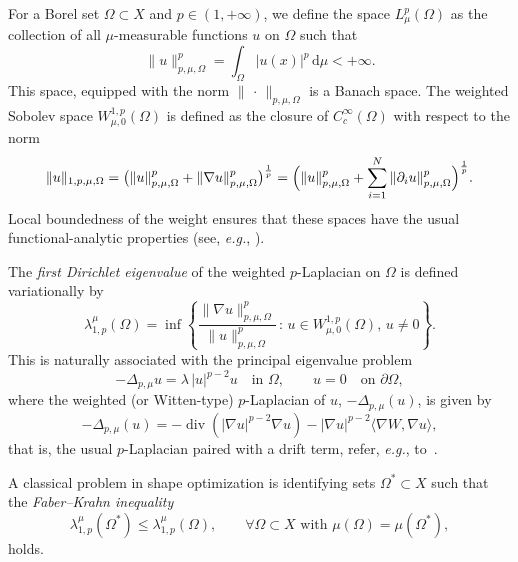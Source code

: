 \documentclass[a4paper,12pt,reqno]{amsart}
\numberwithin{equation}{section}
\DeclareMathOperator{\Div}{div}
\renewcommand{\div}{\Div}
\theoremstyle{plain}
\theoremstyle{definition}
\begin{document}
For a Borel set $\Omega\subset X$ and $p\in(1,+\infty)$, we define the space $L^p_\mu(\Omega)$ as the collection of all $\mu$-measurable functions $u$ on $\Omega$ such that
%
\[
\|u\|_{p,\mu,\Omega}^p = \int_\Omega |u(x)|^p \,\mathrm{d}\mu < +\infty.
\]
%
This space, equipped with the norm $\|\,\cdot\,\|_{p,\mu,\Omega}$ is a Banach space.
%
The weighted Sobolev space $W^{1,p}_{\mu,0}(\Omega)$ is defined as the closure of $C^\infty_c(\Omega)$ with respect to the norm
%
\begin{equation}
\label{eq:norm}
\|u\|_{1,p,\mu,\Omega}
= 
\bigl(\|u\|_{p,\mu,\Omega}^p + \|\nabla u\|_{p,\mu,\Omega}^p \bigr)^{\frac1p}
= 
\Bigl(\|u\|_{p,\mu,\Omega}^p + \sum_{i=1}^N \|\partial_i u\|^p_{p,\mu,\Omega} \Bigr)^{\frac1p}.
\end{equation}
%
Local boundedness of the weight ensures that these spaces have the usual functional-analytic properties (see, \emph{e.g.}, \cite{Bre10book,KO84}).

The \emph{first Dirichlet eigenvalue} of the weighted $p$-Laplacian on $\Omega$ is defined variationally by
%
\begin{equation*}
\lambda_{1,p}^\mu(\Omega)
=
\inf
\left\{
\frac{\|\nabla u\|^p_{p,\mu,\Omega}}{\|u\|^p_{p,\mu,\Omega}} \,:\, u\in W^{1,p}_{\mu,0}(\Omega),\, u \neq 0
\right\}.
\end{equation*}
%
This is naturally associated with the principal eigenvalue problem 
%
\[
-\Delta_{p,\mu} u = \lambda\,|u|^{p-2}u \quad\text{in }\Omega,\qquad u=0\quad\text{on }\partial\Omega,
\]
%
where the weighted (or Witten-type) $p$-Laplacian of $u$, $-\Delta_{p,\mu}(u)$, is given by
%
\[
-\Delta_{p,\mu}(u) = -\div(|\nabla u|^{p-2}\nabla u) - |\nabla u|^{p-2}\langle \nabla W, \nabla u\rangle,
\]
%
that is, the usual $p$-Laplacian paired with a drift term, refer, \emph{e.g.}, to~\cite{DMWX21}.

A classical problem in shape optimization is identifying sets $\Omega^*\subset X$ such that the \emph{Faber--Krahn inequality}
%
\begin{equation}
\label{eq:fk-ineq}
\lambda_{1,p}^\mu(\Omega^*) \le \lambda_{1,p}^\mu(\Omega), \qquad \forall \Omega\subset X \text{ with } \mu(\Omega)=\mu(\Omega^*),
\end{equation}
%
holds. 
\end{document}
